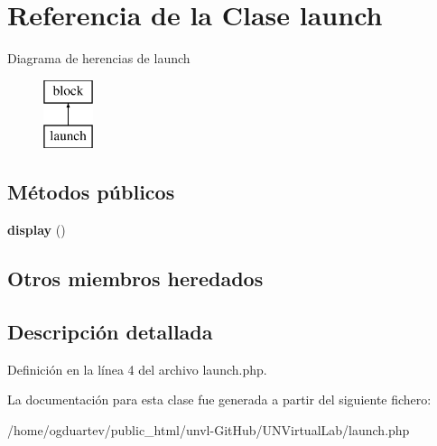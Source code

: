 \hypertarget{classlaunch}{}\section{Referencia de la Clase launch}
\label{classlaunch}
Diagrama de herencias de launch\begin{figure}[H]
\begin{center}
\leavevmode
\includegraphics[height=2.000000cm]{classlaunch}
\end{center}
\end{figure}
\subsection*{Métodos públicos}
\begin{DoxyCompactItemize}
\item 
\mbox{\label{classlaunch_adbcff964560eebe408b060ff667ff24b}} 
{\bfseries display} ()
\end{DoxyCompactItemize}
\subsection*{Otros miembros heredados}


\subsection{Descripción detallada}


Definición en la línea 4 del archivo launch.\+php.



La documentación para esta clase fue generada a partir del siguiente fichero\+:\begin{DoxyCompactItemize}
\item 
/home/ogduartev/public\+\_\+html/unvl-\/\+Git\+Hub/\+U\+N\+Virtual\+Lab/launch.\+php\end{DoxyCompactItemize}
